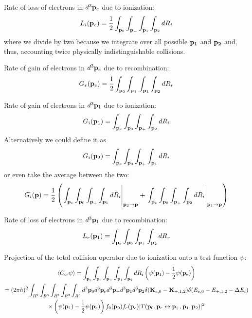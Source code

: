 \documentclass{article}[draft]
\begin{document}
Rate of loss of electrons in $d^3 \mathbf{p}_e$ due to ionization:
\begin{align*}
L_i\of{\vect{p}_e} = \frac{1}{2} \int_{\vect{p}_0} \int_{\vect{p}_+} \int_{\vect{p}_1} \int_{\vect{p}_2} d R_i
\end{align*}
where we divide by two because we integrate over all possible $\mathbf{\mathbf{p}_1}$ and $\mathbf{\mathbf{p}_2}$ and, thus, accounting twice physically indistinguishable collisions.

Rate of gain of electrons in $d^3 \mathbf{p}_e$ due to recombination:
\begin{align*}
G_r\of{\vect{p}_e} = \frac{1}{2} \int_{\vect{p}_0} \int_{\vect{p}_+} \int_{\vect{p}_1} \int_{\vect{p}_2} d R_r
\end{align*}

Rate of gain of electrons in $d^3 \mathbf{p}_1$ due to ionization:
\begin{align*}
G_i\of{\vect{p}_1} = \int_{\vect{p}_e} \int_{\vect{p}_0} \int_{\vect{p}_+} \int_{\vect{p}_2} d R_i
\end{align*}
Alternatively we could define it as
\begin{align*}
G_i\of{\vect{p}_2} = \int_{\vect{p}_e} \int_{\vect{p}_0} \int_{\vect{p}_+} \int_{\vect{p}_1} d R_i
\end{align*} 
or even take the average between the two:
\begin{align*}
G_i\of{\vect{p}} = 
\frac12\left( 
\left. \int_{\vect{p}_e} \int_{\vect{p}_0} \int_{\vect{p}_+} \int_{\vect{p}_1} d R_i \right|_{\vect{p}_2 \rightarrow \vect{p}}
+
\left. \int_{\vect{p}_e} \int_{\vect{p}_0} \int_{\vect{p}_+} \int_{\vect{p}_2} d R_i \right|_{\vect{p}_1 \rightarrow \vect{p}}
\right)
\end{align*} 

Rate of loss of electrons in $d^3 \mathbf{p}_1$ due to recombination:
\begin{align*}
L_r\of{\vect{p}_1} = \int_{\vect{p}_e} \int_{\vect{p}_0} \int_{\vect{p}_+} \int_{\vect{p}_2} d R_r
\end{align*}

Projection of the total collision operator due to ionization onto a test function $\psi$:
\begin{multline*}
\left< C_i, \psi \right> = 
\int_{\vect{p}_e} \int_{\vect{p}_0} 
\int_{\vect{p}_+} \int_{\vect{p}_1} \int_{\vect{p}_2} 
d R_i \left( \psi\of{\vect{p}_1}  
- \frac12 \psi\of{\vect{p}_e} \right)
\\
= (2\pi h)^2 
\int_{R^3} \int_{R^3} 
\int_{R^3} \int_{R^3} \int_{R^3} 
d^3 \vect{p}_0 d^3 \vect{p}_e
d^3 \vect{p}_+ d^3 \vect{p}_1 d^3 \vect{p}_2 
\delta\of{\vect{K}_{e,0} - \vect{K}_{+,1,2}} 
\delta\of{E_{e,0} - E_{+,1,2} - \Delta E_i}
\\
\times
\left( \psi\of{\vect{p}_1}  
- \frac12 \psi\of{\vect{p}_e} \right) f_0\of{\vect{p}_0} f_e\of{\vect{p}_e} 
| T\of{\vect{p}_0, \vect{p}_e \leftrightarrow \vect{p}_+, \vect{p}_1, \vect{p}_2} |^2
\end{multline*}
\end{document}
